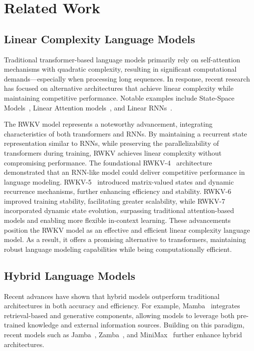 \section{Related Work}

\subsection{Linear Complexity Language Models}
Traditional transformer-based language models primarily rely on self-attention mechanisms with quadratic complexity, resulting in significant computational demands—especially when processing long sequences. 
In response, recent research has focused on alternative architectures that achieve linear complexity while maintaining competitive performance.
Notable examples include State-Space Models~\cite{gu2023mamba}, Linear Attention models~\cite{katharopoulos2020transformers}, and Linear RNNs~\cite{orvieto2023resurrecting}.

The RWKV model\cite{peng2023rwkv} represents a noteworthy advancement, integrating characteristics of both transformers and RNNs. By maintaining a recurrent state representation similar to RNNs, while preserving the parallelizability of transformers during training, RWKV achieves linear complexity without compromising performance. The foundational RWKV-4~\cite{peng2023rwkv} architecture demonstrated that an RNN-like model could deliver competitive performance in language modeling. RWKV-5~\cite{peng2024eagle} introduced matrix-valued states and dynamic recurrence mechanisms, further enhancing efficiency and stability. RWKV-6~\cite{peng2024eagle} improved training stability, facilitating greater scalability, while RWKV-7~\cite{peng2025rwkv7gooseexpressivedynamic} incorporated dynamic state evolution, surpassing traditional attention-based models and enabling more flexible in-context learning.
These advancements position the RWKV model as an effective and efficient linear complexity language model. As a result, it offers a promising alternative to transformers, maintaining robust language modeling capabilities while being computationally efficient.

\subsection{Hybrid Language Models}
Recent advances have shown that hybrid models outperform traditional architectures in both accuracy and efficiency. For example, Mamba~\cite{gu2023mamba} integrates retrieval-based and generative components, allowing models to leverage both pre-trained knowledge and external information sources. Building on this paradigm, recent models such as Jamba~\cite{Lieber2024JambaAH}, Zamba~\cite{glorioso2024zambacompact7bssm}, and MiniMax~\cite{minimax2025minimax01scalingfoundationmodels} further enhance hybrid architectures.

